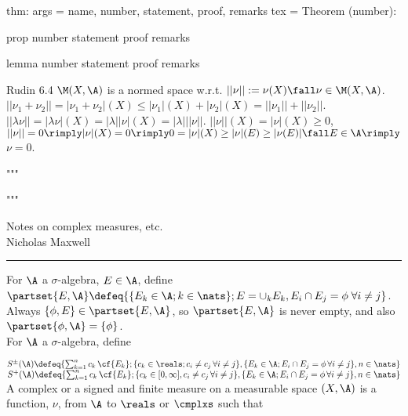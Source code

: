 thm:
args = { name, number, statement, proof, remarks }
tex  = 
Theorem (number):

prop
    number
    statement
    proof
    remarks

lemma
    number
    statement
    proof
    remarks




Rudin 6.4
$\M(X, \A)$ is a normed space w.r.t. $||\nu|| := \nu(X) \fall \nu \in \M(X, \A)$.
$|| \nu_1 + \nu_2 || = |\nu_1 + \nu_2|(X) \le |\nu_1|(X) + |\nu_2|(X) = ||\nu_1|| + ||\nu_2|| $. $||\lambda \nu|| = |\lambda \nu|(X) = |\lambda| |\nu|(X) = |\lambda| ||\nu||$. $||\nu||(X) = |\nu|(X) \ge 0$, $||\nu|| = 0 \rimply |\nu|(X) = 0 \rimply 0 = |\nu|(X) \ge |\nu|(E) \ge |\nu(E)| \fall E \in \A \rimply$ $\nu = 0$.

"""




"""



\begin{flushleft}
Notes on complex measures, etc. \\
Nicholas Maxwell\\
\end{flushleft}

\begin{flushleft}
\addvspace{5pt} \hrule
\end{flushleft}	

For $\A$ a $\sigma$-algebra, $E \in \A$, define $\partset{E, \A} \defeq \{ \{ E_k \in \A; k \in \nats \}; E = \cup_k E_k, E_i \cap E_j = \phi \;  \forall i \not = j \}$. Always $ \{ \phi, E \} \in \partset{E, \A}$, so $\partset{E, \A}$ is never empty, and also $\partset{\phi, \A} = \{ \phi \}$.    \\

For $\A$ a $\sigma$-algebra, define 


\noindent
$S^\pm(\A) \defeq \{ \sum_{k=1}^n c_k \, \cf{E_k}; \{c_k \in\reals; c_i \not = c_j \, \forall i \not = j\}, \{E_k \in \A; E_i \cap E_j = \phi \, \forall i \not = j \}, n \in \nats \}$ \\
\noindent
$S^{+}(\A) \defeq \{ \sum_{k=1}^n c_k \, \cf{E_k}; \{c_k \in [0, \infty], c_i \not = c_j \, \forall i \not = j\}, \{E_k \in \A; E_i \cap E_j = \phi \, \forall i \not = j \}, n \in \nats \}$ \\



A complex or a signed and finite measure on a measurable space $(X,\A)$ is a function, $\nu$, from $\A$ to $\reals$ or $\cmplxs$ such that


